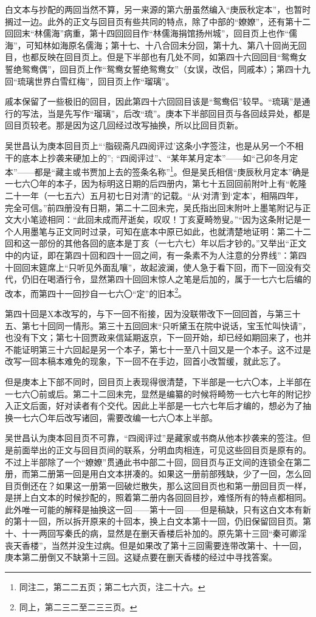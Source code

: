 \par 白文本与抄配的两回当然不算，另一来源的第六册虽然编入“庚辰秋定本”，也暂时搁过一边。此外的正文与回目页有些共同的特点，除了中部的“嫽嫽”，还有第十二回回末“林儒海”病重，第十四回回目作“林儒海捐馆扬州城”，回目页上也作“儒海”，可知林如海原名儒海；第十七、十八合回未分回，第十九、第八十回尚无回目，也都反映在回目页上。但是下半部也有几处不同，如第四十六回回目“鸳鸯女誓绝鸳鸯偶”，回目页上作“鸳鸯女誓绝鸳鸯女”（女误，改侣，同戚本）；第四十九回“琉璃世界白雪红梅”，回目页上作“瑠璃”。
\par 戚本保留了一些极旧的回目，因此第四十六回回目该是“鸳鸯侣”较早。“琉璃”是通行的写法，当是先写作“瑠璃”，后改“琉”。庚本下半部回目页与各回歧异处，都是回目页较老。那是因为这几回经过改写抽换，所以比回目页新。
\par 吴世昌认为庚本回目页上“‘脂砚斋凡四阅评过’这条小字签注，也是从另一个不相干的底本上抄袭来硬加上的”; “四阅评过”、“某年某月定本”——如“己卯冬月定本”——都是“藏主或书贾加上去的签条名称”\footnote{同注二，第二二五页；第二七六页，注二十六。}。但是吴氏相信“庚辰秋月定本”确是一七六〇年的本子，因为标明这日期的后四册内，第七十五回回前附叶上有“乾隆二十一年（一七五六）五月初七日对清”的记载。“从‘对清’到‘定本’，相隔四年，完全可信。”前四册没有日期，第二十二回未完，吴氏指出回末附叶上墨笔附记与正文大小笔迹相同：“此回未成而芹逝矣，叹叹！丁亥夏畸笏叟。”“因为这条附记是一个人用墨笔与正文同时过录，可知在底本中原已如此，也就清楚地证明：第二十二回和这一部份的其他各回的底本是丁亥（一七六七）年以后才钞的。”又举出“正文中的内证，即在第四十回和四十一回之间，有一条素不为人注意的分界线”：第四十回回末筵席上“只听见外面乱嚷”，故起波澜，使人急于看下回，而下一回没有交代，仍旧在喝酒行令，显然第四十回回末惊人之笔是后加的，属于一七六七后编的改本，而第四十一回抄自一七六〇“定”的旧本\footnote{同上，第二三二至二三三页。}。
\par 第四十回是X本改写的，与下一回不衔接，因为没联带改下一回回首，与第三十五、第七十回同一情形。第三十五回回末“只听黛玉在院中说话，宝玉忙叫快请”，也没有下文；第七十回贾政来信延期返京，下一回开始，却已经如期回来了，也并不能证明第三十六回起是另一个本子，第七十一至八十回又是一个本子。这不过是改写一回本稿本难免的现象，下一回不在手边，回首小改暂缓，就此忘了。
\par 但是庚本上下部不同时，回目页上表现得很清楚，下半部是一七六〇本，上半部在一七六〇前或后。第二十二回未完，显然是编纂的时候将畸笏一七六七年的附记抄入正文后面，好对读者有个交代。因此上半部是一七六七年后才编的，想必为了抽换一七六〇年后改写诸回，需要改编一七六〇本上半部。
\par 吴世昌认为庚本回目页不可靠，“四阅评过”是藏家或书商从他本抄袭来的签注。但是前面举出的正文与回目页间的联系，分明血肉相连，可见这些回目页是原有的。不过上半部除了一个“嫽嫽”贯通此书中部二十回，回目页与正文间的连锁全在第二册，而第二册第一回是用白文本拼凑的。如果这一册前部残缺，少了一回，怎么回目页倒还在？如果这一册第一回破烂散失，那么这回目页也和第一册回目页一样，是拼上白文本的时候抄配的，照着第二册内各回回目抄，难怪所有的特点都相同。此外唯一可能的解释是抽换这一回——第十一回——但是稿缺，只有这白文本有新的第十一回，所以拆开原来的十回本，换上白文本第十一回，仍旧保留回目页。第十、十一两回写秦氏的病，显然是在删天香楼后补加的。原先第十三回“秦可卿淫丧天香楼”，当然并没生过病。但是如果改了第十三回需要连带改第十、十一回，庚本第二册倒又不缺第十三回。这疑点要在删天香楼的经过中寻找答案。
